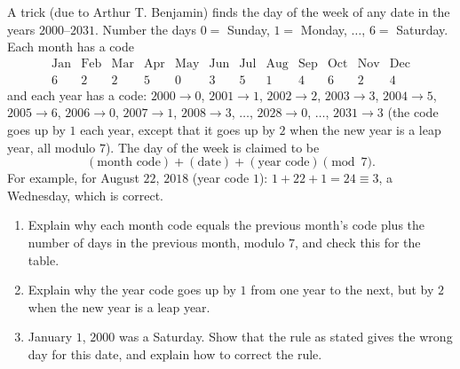 A trick (due to Arthur T. Benjamin) finds the day of the week of any date in the years $2000$--$2031$. Number the days $0=$ Sunday, $1=$ Monday, $\dots$, $6=$ Saturday. Each month has a code
\[
\begin{array}{cccccccccccc}
\text{Jan}&\text{Feb}&\text{Mar}&\text{Apr}&\text{May}&\text{Jun}&\text{Jul}&\text{Aug}&\text{Sep}&\text{Oct}&\text{Nov}&\text{Dec}\\
6&2&2&5&0&3&5&1&4&6&2&4
\end{array}
\]
and each year has a code: $2000\to0$, $2001\to1$, $2002\to2$, $2003\to3$, $2004\to5$, $2005\to6$, $2006\to0$, $2007\to1$, $2008\to3$, $\dots$, $2028\to0$, $\dots$, $2031\to3$ (the code goes up by $1$ each year, except that it goes up by $2$ when the new year is a leap year, all modulo $7$). The day of the week is claimed to be
\[
(\text{month code})+(\text{date})+(\text{year code})\pmod 7 .
\]
For example, for August $22$, $2018$ (year code $1$): $1+22+1=24\equiv3$, a Wednesday, which is correct.
\begin{enumerate}
\item[(a)] Explain why each month code equals the previous month's code plus the number of days in the previous month, modulo $7$, and check this for the table.
\item[(b)] Explain why the year code goes up by $1$ from one year to the next, but by $2$ when the new year is a leap year.
\item[(c)] January $1$, $2000$ was a Saturday. Show that the rule as stated gives the wrong day for this date, and explain how to correct the rule.
\end{enumerate}
